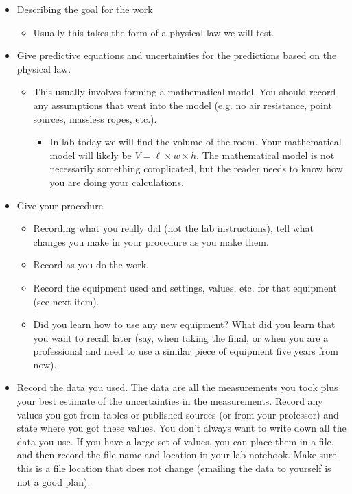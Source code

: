 \documentclass[twoside,11pt,ShortChapTitles]{BYUTextbook}
\begin{document}
\begin{itemize}
\item Describing the goal for the work

\begin{itemize}
\item Usually this takes the form of a physical law we will test.
\end{itemize}

\item Give predictive equations and uncertainties for the predictions based on
the physical law.

\begin{itemize}
\item This usually involves forming a mathematical model. You should record
any assumptions that went into the model (e.g. no air resistance, point
sources, massless ropes, etc.).

\begin{itemize}
\item In lab today we will find the volume of the room. Your mathematical
model will likely be $V=\ell\times w\times h.$ The mathematical model is not
necessarily something complicated, but the reader needs to know how you are
doing your calculations.
\end{itemize}
\end{itemize}

\item Give your procedure

\begin{itemize}
\item Recording what you really did (not the lab instructions), tell what
changes you make in your procedure as you make them.

\item Record as you do the work.

\item Record the equipment used and settings, values, etc. for that equipment
(see next item).

\item Did you learn how to use any new equipment? What did you learn that you
want to recall later (say, when taking the final, or when you are a
professional and need to use a similar piece of equipment five years from now).
\end{itemize}

\item Record the data you used. The data are all the measurements you took
plus your best estimate of the uncertainties in the measurements. Record any
values you got from tables or published sources (or from your professor) and
state where you got these values. You don't always want to write down all the
data you use. If you have a large set of values, you can place them in a file,
and then record the file name and location in your lab notebook. Make sure
this is a file location that does not change (emailing the data to yourself is
not a good plan).


\end{itemize}
\end{document}
